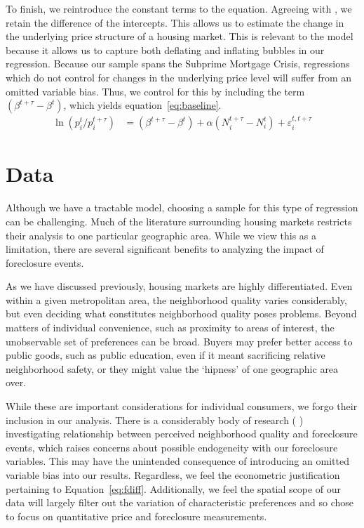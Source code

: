 \documentclass[12pt,oneside]{amsbook}
\newcommand{\bet}{\beta^t}
\newcommand{\dos}{{t + \tau}}
\newcommand{\teps}{\varepsilon^{t,\dos}_i}
\begin{document}
To finish, we reintroduce the constant terms to the equation. Agreeing with \cite{Chi}, we retain the difference of the intercepts. This allows us to estimate the change in the underlying price structure of a housing market. This is relevant to the model because it allows us to capture both deflating and inflating bubbles in our regression. Because our sample spans the Subprime Mortgage Crisis, regressions which do not control for changes in the underlying price level will suffer from an omitted variable bias. Thus, we control for this by including the term $(\beta^\dos - \bet)$, which yields equation~\ref{eq:baseline}.
\begin{align}
\ln (p^t_{i} / p^\dos_i) & = (\beta^\dos - \bet) + \alpha ( N_i^\dos - N_i^t ) + \teps \label{eq:baseline}
\end{align}

\section{Data}
Although we have a tractable model, choosing a sample for this type of regression can be challenging. Much of the literature surrounding housing markets restricts their analysis to one particular geographic area. While we view this as a limitation, there are several significant benefits to analyzing the impact of foreclosure events.

As we have discussed previously, housing markets are highly differentiated. Even within a given metropolitan area, the neighborhood quality varies considerably, but even deciding what constitutes neighborhood quality poses problems. Beyond matters of individual convenience, such as proximity to areas of interest, the unobservable set of preferences can be broad. Buyers may prefer better access to public goods, such as public education, even if it meant sacrificing relative neighborhood safety, or they might value the `hipness' of one geographic area over. 

While these are important considerations for individual consumers, we forgo their inclusion in our analysis. There is a considerably body of research (\cite{Crime} \cite{Immer} \cite{Leo}) investigating relationship between perceived neighborhood quality and foreclosure events, which raises concerns about possible endogeneity with our foreclosure variables. This may have the unintended consequence of introducing an omitted variable bias into our results. Regardless, we feel the econometric justification pertaining to Equation~\ref{eq:fdiff}. Additionally, we feel the spatial scope of our data will largely filter out the variation of characteristic preferences and so chose to focus on quantitative price and foreclosure measurements. 
\end{document}
